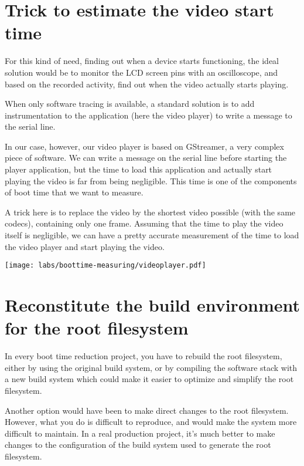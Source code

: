 \section{Trick to estimate the video start time}

For this kind of need, finding out when a device starts functioning,
the ideal solution would be to monitor the LCD screen pins with an
oscilloscope, and based on the recorded activity, find out when the
video actually starts playing.

When only software tracing is available, a standard solution is to
add instrumentation to the application (here the video player) to write a message to
the serial line.

In our case, however, our video player is based on GStreamer, a very
complex piece of software. We can write a message on the serial line
before starting the player application, but the time to load this
application and actually start playing the video is far from being
negligible. This time is one of the components of boot time that we want to
measure.

A trick here is to replace the video by the shortest video possible
(with the same codecs), containing only one frame. Assuming that
the time to play the video itself is negligible, we can have a pretty
accurate measurement of the time to load the video player and start
playing the video.

\begin{center}
\texttt{[image: labs/boottime-measuring/videoplayer.pdf]}
\end{center}

\section{Reconstitute the build environment for the root filesystem}

In every boot time reduction project, you have to rebuild the root
filesystem, either by using the original build system, or by compiling
the software stack with a new build system which could make it
easier to optimize and simplify the root filesystem.

Another option would have been to make direct changes to the root
filesystem. However, what you do is difficult to reproduce, and would
make the system more difficult to maintain. In a real production
project, it's much better to make changes to the configuration of
the build system used to generate the root filesystem.

